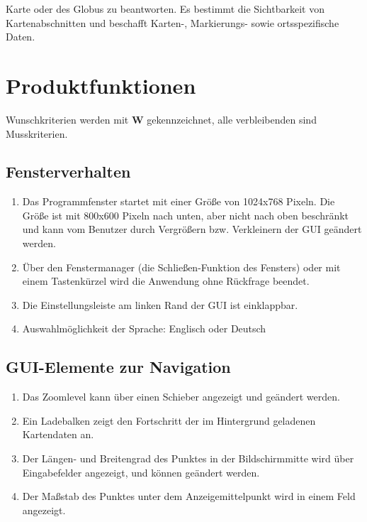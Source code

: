 \documentclass[10pt]{scrreprt}
\newcommand{\sfbf}[1]{\textbf{\sffamily #1}}
\newcommand{\W}{\sfbf{W}}
\newcommand{\ziel}[1]{{\fontsize{9.5}{11}\textsf{/#1/}}}
\newcommand{\ziellabel}{Z}
\newcommand{\muss}{\renewcommand{\labelenumi}{\textbf{\ziel{\ziellabel\numprint{\theenumi}0}}}}
\begin{document}
 Karte oder des Globus zu beantworten. Es bestimmt die Sichtbarkeit von Kartenabschnitten und beschafft Karten-, Markierungs- sowie ortsspezifische Daten.


\chapter{Produktfunktionen}

\muss
\renewcommand{\ziellabel}{F}

Wunschkriterien werden mit {\W } gekennzeichnet, alle verbleibenden sind Musskriterien.

\section{Fensterverhalten}
\begin{enumerate}[leftmargin=2.2cm]
\item Das Programmfenster startet mit einer Größe von 1024x768 Pixeln. Die Größe ist mit 800x600 Pixeln nach unten, aber nicht nach oben beschränkt und kann vom Benutzer durch Vergrößern bzw. Verkleinern der GUI geändert werden.
\item Über den Fenstermanager (die Schließen-Funktion des Fensters) oder mit einem Tastenkürzel wird die Anwendung ohne Rückfrage beendet.
\item Die Einstellungsleiste am linken Rand der GUI ist einklappbar.
\item Auswahlmöglichkeit der Sprache: Englisch oder Deutsch
\end{enumerate}

\section{GUI-Elemente zur Navigation}
\begin{enumerate}[leftmargin=2.2cm,resume]
\item Das Zoomlevel kann über einen Schieber angezeigt und geändert werden.
\item Ein Ladebalken zeigt den Fortschritt der im Hintergrund geladenen Kartendaten an.
\item Der Längen- und Breitengrad des Punktes in der Bildschirmmitte wird über Eingabefelder angezeigt, und können geändert werden.
\item Der Maßstab des Punktes unter dem Anzeigemittelpunkt wird in einem Feld angezeigt.
\end{enumerate}
\end{document}
